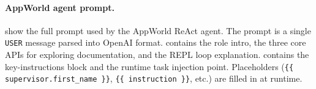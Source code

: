 %
%
%


\paragraph{AppWorld agent prompt.}
 show the full prompt used by the AppWorld ReAct agent. The prompt is a single \texttt{USER} message parsed into OpenAI format.  contains the role intro, the three core APIs for exploring documentation, and the REPL loop explanation.  contains the key-instructions block and the runtime task injection point. Placeholders (\texttt{\{\{ supervisor.first\_name \}\}}, \texttt{\{\{ instruction \}\}}, etc.) are filled in at runtime.

